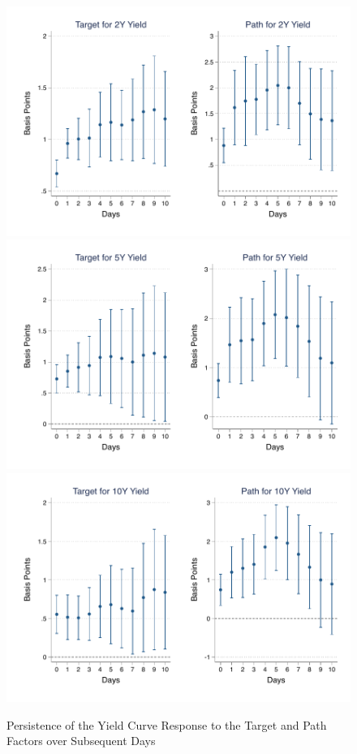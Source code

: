 \documentclass{article}
\begin{document}
\begin{figure}[tbph]
	\begin{center}
		\caption{Persistence of the Yield Curve Response to the Target and Path Factors over Subsequent Days}
		\label{fig:persistsym}
		\includegraphics[trim={0.6cm 0cm 0.5cm 0cm},clip,height=.2\textheight,width=1\textwidth]{persistsymgmxn02yr} \\
		\includegraphics[trim={0.6cm 0cm 0.5cm 0cm},clip,height=.2\textheight,width=1\textwidth]{persistsymgmxn05yr} \\
		\includegraphics[trim={0.6cm 0cm 0.5cm 0cm},clip,height=.2\textheight,width=1\textwidth]{persistsymgmxn10yr} \\

\end{center}
\end{figure}
\end{document}
